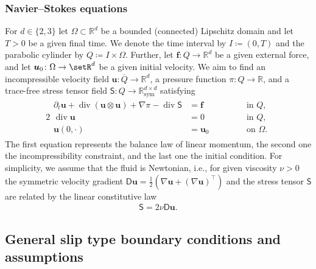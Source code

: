 \documentclass[reqno,a4paper]{amsart}
\def\tens#1{\pmb{\mathsf{#1}}}
\def\vec#1{\boldsymbol{#1}}
\def\sym{\mathop{\mathrm{sym}}\nolimits}
\def\Rds{\mathbb{R}^{d \times d}_{\sym}}
\def\diver{\mathop{\mathrm{div}}\nolimits} %
\def\bf{\vec{f}}
\def\bu{\vec{u}}
\def\BD{\tens{D}}
\def\BS{\tens{S}}
\begin{document}
	\subsubsection*{Navier--Stokes equations}
	
	For $d \in \{2,3\}$ let $\Omega \subset \mathbb{R}^d$ be a bounded (connected) Lipschitz domain and let $T >0$ be a given final time. 
	We denote the time interval by $I \coloneqq (0,T)$ and the parabolic cylinder by $Q \coloneqq I \times \Omega$. 
	Further, let $\bf\colon Q \to \mathbb{R}^d$ be a given external force, and let $\bu_0 \colon \Omega \to \setR^d$ be a given initial velocity.
	We aim to find an incompressible velocity field $\bu\colon \overline{Q} \to \mathbb{R}^d$, a pressure function $\pi\colon Q \to \mathbb{R}$, and a trace-free stress tensor field $\BS\colon Q \to \Rds$ satisfying
	\begin{alignat}{2}
		\begin{aligned}
			\label{eq:NS-unst}
			\partial_t \bu +	\diver(\bu \otimes \bu) + \nabla \pi
			-\diver\BS &= \bf \qquad \quad &&\text{ in } Q,\\
			\diver\bu &= 0 \qquad \quad &&\text{ in } Q,\\
			\bu(0,\cdot) &= \bu_0 \quad && \text{ on } \Omega.
		\end{aligned}
	\end{alignat}
	The first equation represents the balance law of linear momentum, the second one the incompressibility constraint, and the last one the initial condition. 
	For simplicity, we assume that the fluid is Newtonian, i.e., for given viscosity $\nu >0$ the symmetric velocity gradient $\BD \bu = \tfrac{1}{2}(\nabla \bu + (\nabla \bu)^\top)$ and the stress tensor $\BS$ are related by the linear constitutive law
	\begin{align}\label{eq:NS-law}
		\BS = 2 \nu \BD \bu.
	\end{align}
	
	\subsection{General slip type boundary conditions and assumptions} \label{sec:bc-slip}	
	
\end{document}
